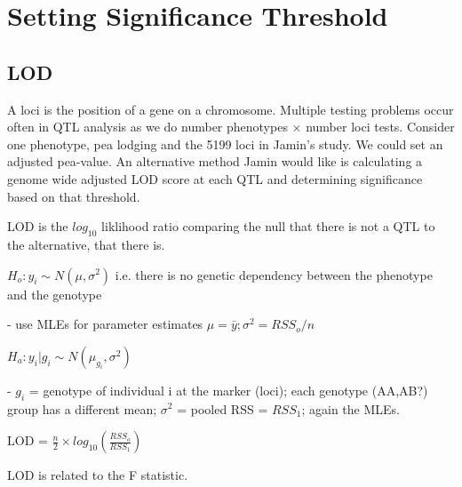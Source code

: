\documentclass{article}\usepackage[]{graphicx}\usepackage[]{color}
\begin{document}
\section{Setting Significance Threshold}

\subsection{LOD}
A loci is the position of a gene on a chromosome. Multiple testing problems occur often in QTL analysis as we do number phenotypes $\times$ number loci tests. Consider one phenotype, pea lodging and the 5199 loci in Jamin's study. We could set an adjusted pea-value. An alternative method Jamin would like is calculating a genome wide adjusted LOD score at each QTL and determining significance based on that threshold.

LOD is the $log_{10}$ liklihood ratio comparing the null that there is not a QTL to the alternative, that there is.

$H_{o}: y_{i} \sim N(\mu, \sigma^2)$ i.e. there is no genetic dependency between the phenotype and the genotype

- use MLEs for parameter estimates $\mu = \bar{y}; \sigma^2 = RSS_{o}/n$

$H_{a}: y_{i}|g_{i} \sim N(\mu_{g_{i}}, \sigma^2)$

- $g_{i}$ = genotype of individual i at the marker (loci); each genotype (AA,AB?) group has a different mean; $\sigma^2$ = pooled RSS = $RSS_{1}$; again the MLEs. 

LOD = $\frac{n}{2} \times log_{10}(\frac{RSS_{o}}{RSS_{1}})$

LOD is related to the F statistic.
\end{document}
